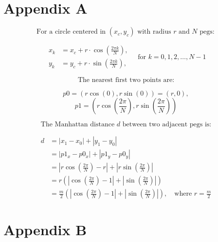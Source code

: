 \chapter*{Appendix A}
\label{app:d}

\[
\text{For a circle centered in } (x_c, y_c) \text{ with radius } r \text{ and } N \text{ pegs}:
\]

\[
\begin{aligned}
x_k &= x_c + r \cdot \cos\left( \frac{2\pi k}{N} \right), \\
y_k &= y_c + r \cdot \sin\left( \frac{2\pi k}{N} \right),
\end{aligned}
\quad \text{for } k = 0, 1, 2, \dots, N - 1
\]

\[
\text{The nearest first two points are:}
\]

\[
p0 = (r\cos(0), r\sin(0)) = (r, 0),
\]
\[
p1 = (r\cos(\frac{2\pi}{N}), r\sin(\frac{2\pi}{N}))
\]

\[\text{The Manhattan distance } d \text{ between two adjacent pegs is:}\]

\[
\begin{aligned}
d &= \left| x_1 - x_0 \right| + \left| y_1 - y_0 \right| \\
  &= \left| p1_x - p0_x \right| + \left| p1_y - p0_y \right| \\
  &= \left| r\cos\left(\frac{2\pi}{N}\right) - r \right| + \left| r\sin\left(\frac{2\pi}{N}\right) \right| \\
  &= r\left( \left| \cos\left(\frac{2\pi}{N}\right) - 1 \right| + \left| \sin\left(\frac{2\pi}{N}\right) \right| \right) \\
  &= \frac{m}{2} \left( \left| \cos\left(\frac{2\pi}{N}\right) - 1 \right| + \left| \sin\left(\frac{2\pi}{N}\right) \right| \right), \quad \text{where } r = \frac{m}{2}
\end{aligned}
\]

\chapter*{Appendix B}
\label{app:greedy}

